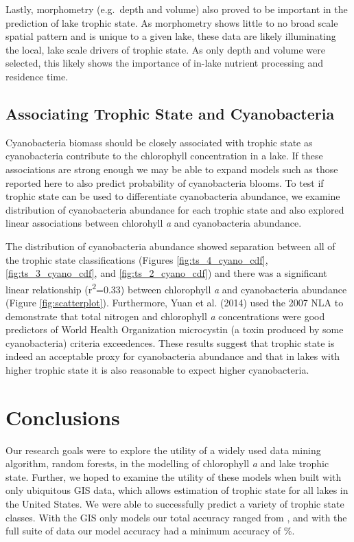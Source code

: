 \documentclass[11pt,]{article}
\begin{document}
Lastly, morphometry (e.g.~depth and volume) also proved to be important
in the prediction of lake trophic state. As morphometry shows little to
no broad scale spatial pattern and is unique to a given lake, these data
are likely illuminating the local, lake scale drivers of trophic state.
As only depth and volume were selected, this likely shows the importance
of in-lake nutrient processing and residence time.

\subsection{Associating Trophic State and
Cyanobacteria}\label{associating-trophic-state-and-cyanobacteria}

Cyanobacteria biomass should be closely associated with trophic state as
cyanobacteria contribute to the chlorophyll concentration in a lake. If
these associations are strong enough we may be able to expand models
such as those reported here to also predict probability of cyanobacteria
blooms. To test if trophic state can be used to differentiate
cyanobacteria abundance, we examine distribution of cyanobacteria
abundance for each trophic state and also explored linear associations
between chlorohyll \emph{a} and cyanobacteria abundance.

The distribution of cyanobacteria abundance showed separation between
all of the trophic state classifications (Figures
\ref{fig:ts_4_cyano_cdf}, \ref{fig:ts_3_cyano_cdf}, and
\ref{fig:ts_2_cyano_cdf}) and there was a significant linear
relationship (r\textsuperscript{2}=0.33) between chlorophyll \emph{a}
and cyanobacteria abundance (Figure \ref{fig:scatterplot}). Furthermore,
Yuan et al. (2014) used the 2007 NLA to demonstrate that total nitrogen
and chlorophyll \emph{a} concentrations were good predictors of World
Health Organization microcystin (a toxin produced by some cyanobacteria)
criteria exceedences. These results suggest that trophic state is indeed
an acceptable proxy for cyanobacteria abundance and that in lakes with
higher trophic state it is also reasonable to expect higher
cyanobacteria.

\section{Conclusions}\label{conclusions}

Our research goals were to explore the utility of a widely used data
mining algorithm, random forests, in the modelling of chlorophyll
\emph{a} and lake trophic state. Further, we hoped to examine the
utility of these models when built with only ubiquitous GIS data, which
allows estimation of trophic state for all lakes in the United States.
We were able to successfully predict a variety of trophic state classes.
With the GIS only models our total accuracy ranged from , and with the
full suite of data our model accuracy had a minimum accuracy of \%.
\end{document}
